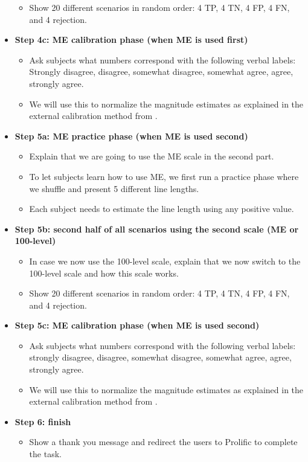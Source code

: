 \documentclass[a4paper]{article}
\begin{document}
\begin{itemize}[leftmargin=*, label={}]
\begin{itemize}
              \item Show 20 different scenarios in random order: 4 TP, 4 TN, 4 FP, 4 FN, and 4 rejection.
          \end{itemize}
    \item \textbf{Step 4c: ME calibration phase (when ME is used first)}
          \begin{itemize}
              \item Ask subjects what numbers correspond with the following verbal labels: Strongly disagree, disagree, somewhat disagree, somewhat agree, agree, strongly agree.
              \item We will use this to normalize the magnitude estimates as explained in the external calibration method from \cite{moskowitz1977magnitude}.
          \end{itemize}
    \item \textbf{Step 5a: ME practice phase (when ME is used second)}
          \begin{itemize}
              \item Explain that we are going to use the ME scale in the second part.
              \item To let subjects learn how to use ME, we first run a practice phase where we shuffle and present 5 different line lengths.
              \item Each subject needs to estimate the line length using any positive value.
          \end{itemize}
    \item \textbf{Step 5b: second half of all scenarios using the second scale (ME or 100-level)}
          \begin{itemize}
              \item In case we now use the 100-level scale, explain that we now switch to the 100-level scale and how this scale works.
              \item Show 20 different scenarios in random order: 4 TP, 4 TN, 4 FP, 4 FN, and 4 rejection.
          \end{itemize}
    \item \textbf{Step 5c: ME calibration phase (when ME is used second)}
          \begin{itemize}
              \item Ask subjects what numbers correspond with the following verbal labels: strongly disagree, disagree, somewhat disagree, somewhat agree, agree, strongly agree.
              \item We will use this to normalize the magnitude estimates as explained in the external calibration method from \cite{moskowitz1977magnitude}.
          \end{itemize}

    \item \textbf{Step 6: finish}
          \begin{itemize}
              \item Show a thank you message and redirect the users to Prolific to complete the task.
          \end{itemize}
\end{itemize}
\end{document}
